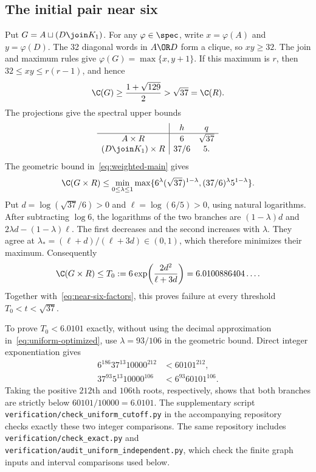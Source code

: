 \subsection{The initial pair near six}

Put $G=A\sqcup(D\join K_1)$. For any $\varphi\in\spec$, write
$x=\varphi(A)$ and $y=\varphi(D)$. The 32 diagonal words in
$A\OR D$ form a clique, so $xy\ge32$. The join and maximum rules give
$\varphi(G)=\max\{x,y+1\}$. If this maximum is $r$, then
$32\le xy\le r(r-1)$, and hence
\begin{equation}\label{eq:near-six-factors}
 \C(G)\ge\frac{1+\sqrt{129}}2>\sqrt{37}=\C(R).
\end{equation}
The projections give the spectral upper bounds
\[
\begin{array}{c|cc}
 &h&q\\ \hline
 A\times R&6&\sqrt{37}\\
 (D\join K_1)\times R&37/6&5.
\end{array}
\]
The geometric bound in~\eqref{eq:weighted-main} gives
\[
 \C(G\times R)\le
 \min_{0\le\lambda\le1}
 \max\{6^\lambda(\sqrt{37})^{1-\lambda},
          (37/6)^\lambda5^{1-\lambda}\}.
\]
Put $d=\log(\sqrt{37}/6)>0$ and $\ell=\log(6/5)>0$,
using natural logarithms.
After subtracting $\log6$, the logarithms of the two branches are
$(1-\lambda)d$ and $2\lambda d-(1-\lambda)\ell$.
The first decreases and the second increases with $\lambda$.
They agree at $\lambda_*=(\ell+d)/(\ell+3d)\in(0,1)$,
which therefore minimizes their maximum. Consequently
\begin{equation}\label{eq:uniform-optimized}
 \C(G\times R)\le T_0
 :=6\exp\!\left(\frac{2d^2}{\ell+3d}\right)
 =6.0100886404\ldots .
\end{equation}
Together with~\eqref{eq:near-six-factors}, this proves failure at every
threshold $T_0<t<\sqrt{37}$.

To prove $T_0<6.0101$ exactly, without using the decimal approximation
in~\eqref{eq:uniform-optimized}, use $\lambda=93/106$ in the geometric
bound. Direct integer exponentiation gives
\begin{equation}\label{eq:uniform-integer-check}
\begin{aligned}
 6^{186}37^{13}10000^{212}&<60101^{212},\\
 37^{93}5^{13}10000^{106}&<6^{93}60101^{106}.
\end{aligned}
\end{equation}
Taking the positive $212$th and $106$th roots, respectively, shows that
both branches are strictly below $60101/10000=6.0101$.
The supplementary script \nolinkurl{verification/check_uniform_cutoff.py}
in the accompanying repository~\cite{ZeissData} checks exactly these
two integer comparisons. The same repository includes
\nolinkurl{verification/check_exact.py} and
\nolinkurl{verification/audit_uniform_independent.py}, which check the
finite graph inputs and interval comparisons used below.

